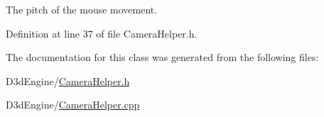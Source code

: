 The pitch of the mouse movement. 



Definition at line 37 of file Camera\+Helper.\+h.



The documentation for this class was generated from the following files\+:\begin{DoxyCompactItemize}
\item 
D3d\+Engine/\mbox{\hyperlink{_camera_helper_8h}{Camera\+Helper.\+h}}\item 
D3d\+Engine/\mbox{\hyperlink{_camera_helper_8cpp}{Camera\+Helper.\+cpp}}\end{DoxyCompactItemize}
